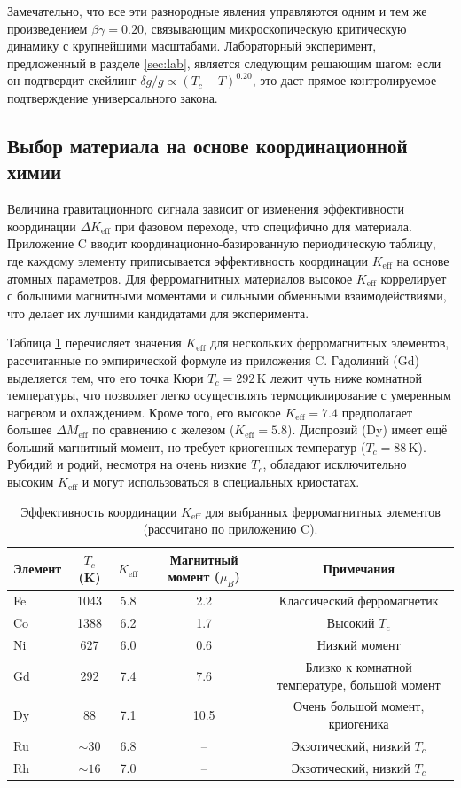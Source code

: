 \documentclass[12pt]{article}
\theoremstyle{remark}
\newcommand{\Keff}{K_{\mathrm{eff}}}
\begin{document}
	Замечательно, что все эти разнородные явления управляются одним и тем же произведением $\beta\gamma = 0.20$, связывающим микроскопическую критическую динамику с крупнейшими масштабами. Лабораторный эксперимент, предложенный в разделе \ref{sec:lab}, является следующим решающим шагом: если он подтвердит скейлинг $\delta g/g \propto (T_c - T)^{0.20}$, это даст прямое контролируемое подтверждение универсального закона.
	
	\subsection{Выбор материала на основе координационной химии}
	\label{subsec:material-choice}
	
	Величина гравитационного сигнала зависит от изменения эффективности координации \(\Delta \Keff\) при фазовом переходе, что специфично для материала. Приложение C вводит координационно-базированную периодическую таблицу, где каждому элементу приписывается эффективность координации \(\Keff\) на основе атомных параметров. Для ферромагнитных материалов высокое \(\Keff\) коррелирует с большими магнитными моментами и сильными обменными взаимодействиями, что делает их лучшими кандидатами для эксперимента.
	
	Таблица \ref{tab:ferro-keff-appP} перечисляет значения \(\Keff\) для нескольких ферромагнитных элементов, рассчитанные по эмпирической формуле из приложения C. Гадолиний (Gd) выделяется тем, что его точка Кюри \(T_c = 292\,\mathrm{K}\) лежит чуть ниже комнатной температуры, что позволяет легко осуществлять термоциклирование с умеренным нагревом и охлаждением. Кроме того, его высокое \(\Keff = 7.4\) предполагает большее \(\Delta M_{\mathrm{eff}}\) по сравнению с железом (\(\Keff = 5.8\)). Диспрозий (Dy) имеет ещё больший магнитный момент, но требует криогенных температур (\(T_c = 88\,\mathrm{K}\)). Рубидий и родий, несмотря на очень низкие \(T_c\), обладают исключительно высоким \(\Keff\) и могут использоваться в специальных криостатах.
	
	\begin{table}[htbp]
		\centering
		\caption{Эффективность координации \(\Keff\) для выбранных ферромагнитных элементов (рассчитано по приложению C).}
		\label{tab:ferro-keff-appP}
		\begin{tabular}{lcccc}
			\toprule
			Элемент & \(T_c\) (K) & \(\Keff\) & Магнитный момент (\(\mu_B\)) & Примечания \\
			\midrule
			Fe & 1043 & 5.8 & 2.2 & Классический ферромагнетик \\
			Co & 1388 & 6.2 & 1.7 & Высокий \(T_c\) \\
			Ni & 627  & 6.0 & 0.6 & Низкий момент \\
			Gd & 292  & 7.4 & 7.6 & Близко к комнатной температуре, большой момент \\
			Dy & 88   & 7.1 & 10.5 & Очень большой момент, криогеника \\
			Ru & \(\sim 30\) & 6.8 & -- & Экзотический, низкий \(T_c\) \\
			Rh & \(\sim 16\) & 7.0 & -- & Экзотический, низкий \(T_c\) \\
			\bottomrule
		\end{tabular}
	\end{table}
	
\end{document}
